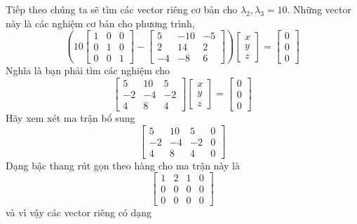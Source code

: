Tiếp theo chúng ta sẽ tìm các vector riêng cơ bản cho $\lambda_{2},\lambda_{3}=10$. Những vector này là các nghiệm cơ bản cho phương trình,
\begin{equation*}
\left(10\begin{bmatrix}1&0&0\\ 0&1&0\\ 0&0&1\end{bmatrix}-\begin{bmatrix}5&-10&-5\\ 2&14&2\\ -4&-8&6\end{bmatrix}\right)\begin{bmatrix}x\\ y\\ z\end{bmatrix}=\begin{bmatrix}0\\ 0\\ 0\end{bmatrix}
\end{equation*}
Nghĩa là bạn phải tìm các nghiệm cho
\begin{equation*}
\begin{bmatrix}5&10&5\\ -2&-4&-2\\ 4&8&4\end{bmatrix}\begin{bmatrix}x\\ y\\ z\end{bmatrix}=\begin{bmatrix}0\\ 0\\ 0\end{bmatrix}
\end{equation*}
Hãy xem xét ma trận bổ sung
\begin{equation*}
\begin{bmatrix}5&10&5&0\\ -2&-4&-2&0\\ 4&8&4&0\end{bmatrix}
\end{equation*}
Dạng bậc thang rút gọn theo hàng cho ma trận này là
\begin{equation*}
\begin{bmatrix}1&2&1&0\\ 0&0&0&0\\ 0&0&0&0\end{bmatrix}
\end{equation*}
và vì vậy các vector riêng có dạng

